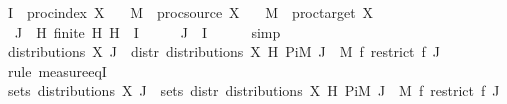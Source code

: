 \begin{isabellebody}
\ {\isacharquery}{\kern0pt}I\ {\isacharequal}{\kern0pt}\ {\isachardoublequoteopen}proc{\isacharunderscore}{\kern0pt}index\ X{\isachardoublequoteclose}\isanewline
\ \ \ {\isacharquery}{\kern0pt}M\ {\isacharequal}{\kern0pt}\ {\isachardoublequoteopen}proc{\isacharunderscore}{\kern0pt}source\ X{\isachardoublequoteclose}\isanewline
\ \ \ {\isacharquery}{\kern0pt}M{\isacharprime}{\kern0pt}\ {\isacharequal}{\kern0pt}\ {\isachardoublequoteopen}proc{\isacharunderscore}{\kern0pt}target\ X{\isachardoublequoteclose}\isanewline
\ \ \isamarkupfalse%
\ {\isacharasterisk}{\kern0pt}{\isacharcolon}{\kern0pt}\ {\isachardoublequoteopen}J\ {\isasymsubseteq}\ H{\isachardoublequoteclose}\ {\isachardoublequoteopen}finite\ H{\isachardoublequoteclose}\ {\isachardoublequoteopen}H\ {\isasymsubseteq}\ {\isacharquery}{\kern0pt}I{\isachardoublequoteclose}\isanewline
\ \ \isamarkupfalse%
\ \isamarkupfalse%
\ {\isachardoublequoteopen}J\ {\isasymsubseteq}\ {\isacharquery}{\kern0pt}I{\isachardoublequoteclose}\isanewline
\ \ \ \ \isamarkupfalse%
\ simp\isanewline
\ \ \isamarkupfalse%
\ {\isachardoublequoteopen}distributions\ X\ J\ {\isacharequal}{\kern0pt}\ distr\ {\isacharparenleft}{\kern0pt}distributions\ X\ H{\isacharparenright}{\kern0pt}\ {\isacharparenleft}{\kern0pt}Pi\isactrlsub M\ J\ {\isacharparenleft}{\kern0pt}{\isasymlambda}{\isacharunderscore}{\kern0pt}{\isachardot}{\kern0pt}\ {\isacharquery}{\kern0pt}M{\isacharprime}{\kern0pt}{\isacharparenright}{\kern0pt}{\isacharparenright}{\kern0pt}\ {\isacharparenleft}{\kern0pt}{\isasymlambda}f{\isachardot}{\kern0pt}\ restrict\ f\ J{\isacharparenright}{\kern0pt}{\isachardoublequoteclose}\isanewline
\ \ \isamarkupfalse%
\ {\isacharparenleft}{\kern0pt}rule\ measure{\isacharunderscore}{\kern0pt}eqI{\isacharparenright}{\kern0pt}\isanewline
\ \ \ \ \isamarkupfalse%
\ {\isachardoublequoteopen}sets\ {\isacharparenleft}{\kern0pt}distributions\ X\ J{\isacharparenright}{\kern0pt}\ {\isacharequal}{\kern0pt}\ sets\ {\isacharparenleft}{\kern0pt}distr\ {\isacharparenleft}{\kern0pt}distributions\ X\ H{\isacharparenright}{\kern0pt}\ {\isacharparenleft}{\kern0pt}Pi\isactrlsub M\ J\ {\isacharparenleft}{\kern0pt}{\isasymlambda}{\isacharunderscore}{\kern0pt}{\isachardot}{\kern0pt}\ {\isacharquery}{\kern0pt}M{\isacharprime}{\kern0pt}{\isacharparenright}{\kern0pt}{\isacharparenright}{\kern0pt}\ {\isacharparenleft}{\kern0pt}{\isasymlambda}f{\isachardot}{\kern0pt}\ restrict\ f\ J{\isacharparenright}{\kern0pt}{\isacharparenright}{\kern0pt}{\isachardoublequoteclose}\isanewline

\end{isabellebody}
